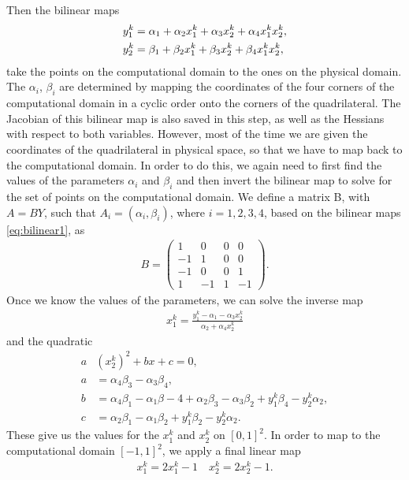 Then the bilinear maps
\begin{align}\label{eq:bilinear1}
	y_1^k &= \alpha_1 + \alpha_2 x_1^k + \alpha_3 x_2^k + \alpha_4 x_1^k x_2^k,\\
	y_2^k &= \beta_1 + \beta_2 x_1^k + \beta_3 x_2^k + \beta_4 x_1^k x_2^k, \notag
\end{align}
take the points on the computational domain to the ones on the physical domain. The $\alpha_i$, $\beta_i$ are determined by mapping the coordinates of the four corners of the computational domain in a cyclic order onto the corners of the quadrilateral. 
The Jacobian of this bilinear map is also saved in this step, as well as the Hessians with respect to both variables.
However, most of the time we are given the coordinates of the quadrilateral in physical space, so that we have to map back to the computational domain. In order to do this, we again need to first find the values of the parameters $\alpha_i$ and $\beta_i$ and then invert the bilinear map to solve for the set of points on the computational domain.
We define a matrix B, with $A = BY$, such that $A_i = (\alpha_i, \beta_i)$, where $i = 1,2,3,4$, based on the bilinear maps \eqref{eq:bilinear1}, as
\begin{align*}
	B  =
	\begin{pmatrix}
		1 & 0 & 0 & 0 \\
		- 1 & 1 & 0 & 0 \\
		-1 & 0 & 0 & 1 \\
		1 & -1 & 1 & -1
	\end{pmatrix}	.
\end{align*}
Once we know the values of the parameters, we can solve the inverse map
\begin{align*}
	x_1^k = \frac{y_1^k - \alpha_1 -\alpha_3 x_2^k}{\alpha_2 + \alpha_4 x_2^k}
\end{align*}
and the quadratic
\begin{align*}
	a&\left(x_2^k\right)^2 + bx + c = 0,\\
	a &= \alpha_4 \beta_3 - \alpha_3 \beta_4,\\
	b &= \alpha_4 \beta_1 - \alpha_1 \beta-4 + \alpha_2 \beta_3 -\alpha_3 \beta_2 + y_1^k \beta_4 - y_2^k \alpha_2,\\
	c &= \alpha_2 \beta_1 - \alpha_1 \beta_2 + y_1^k \beta_2 - y_2^k \alpha_2.
\end{align*}
These give us the values for the $x_1^k$ and $x_2^k$ on $[0,1]^2$. In order to map to the computational domain $[-1,1]^2$, we apply a final linear map
\begin{align*}
	x_1^k = 2x_1^k - 1 \quad	x_2^k = 2x_2^k - 1.
\end{align*}


